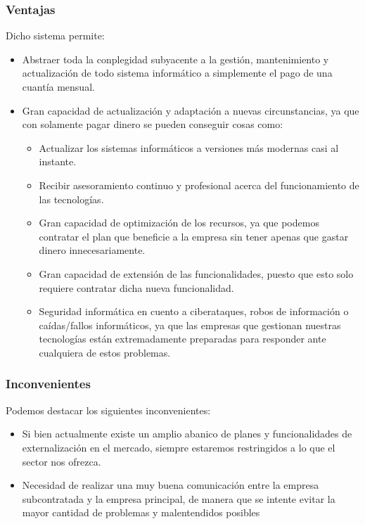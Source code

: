 \documentclass[12pt,letterpaper]{article}
\begin{document}
	\subsubsection{Ventajas} 
	Dicho sistema permite:
	\begin{itemize}  
	\item Abstraer toda la conplegidad subyacente a la gestión, mantenimiento y actualización de todo sistema informático a simplemente el pago de una cuantía mensual.
	\item Gran capacidad de actualización y adaptación a nuevas circunstancias, ya que con solamente pagar dinero se pueden conseguir cosas como:
	\begin{itemize}  
	\item Actualizar los sistemas informáticos a versiones más modernas casi al instante.
	\item Recibir asesoramiento continuo y profesional acerca del funcionamiento de las tecnologías.
	\item Gran capacidad de optimización de los recursos, ya que podemos contratar el plan que beneficie a la empresa sin tener apenas que gastar dinero innecesariamente.
	\item Gran capacidad de extensión de las funcionalidades, puesto que esto solo requiere contratar dicha nueva funcionalidad.
	\item Seguridad informática en cuento a ciberataques, robos de información o caídas/fallos informáticos, ya que las empresas que gestionan nuestras tecnologías están extremadamente preparadas para responder ante cualquiera de estos problemas.
	
	\end{itemize}
	\end{itemize}
	
	\subsubsection{Inconvenientes}
	Podemos destacar los siguientes inconvenientes:
	\begin{itemize}  
	\item Si bien actualmente existe un amplio abanico de planes y funcionalidades de externalización en el mercado, siempre estaremos restringidos a lo que el sector nos ofrezca.
	\item Necesidad de realizar una muy buena comunicación entre la empresa subcontratada y la empresa principal, de manera que se intente evitar la mayor cantidad de problemas y malentendidos posibles
	
	\end{itemize}
	
\end{document}
